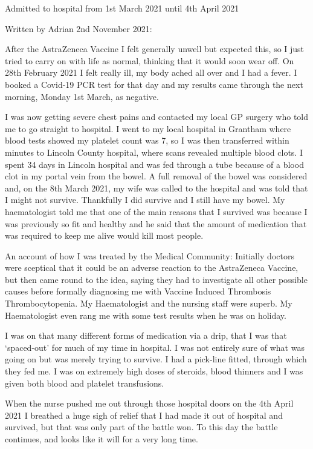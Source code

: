 Admitted to hospital from 1st March 2021 until 4th April 2021

Written by Adrian 2nd November 2021:

After the AstraZeneca Vaccine I felt generally unwell but expected this, so I
just tried to carry on with life as normal, thinking that it would soon wear
off. On 28th February 2021 I felt really ill, my body ached all over and I had a
fever. I booked a Covid-19 PCR test for that day and my results came through the
next morning, Monday 1st March, as negative.

I was now getting severe chest pains and contacted my local GP surgery who told
me to go straight to hospital. I went to my local hospital in Grantham where
blood tests showed my platelet count was 7, so I was then transferred within
minutes to Lincoln County hospital, where scans revealed multiple blood clots. I
spent 34 days in Lincoln hospital and was fed through a tube because of a blood
clot in my portal vein from the bowel. A full removal of the bowel was
considered and, on the 8th March 2021, my wife was called to the hospital and
was told that I might not survive. Thankfully I did survive and I still have my
bowel. My haematologist told me that one of the main reasons that I survived was
because I was previously so fit and healthy and he said that the amount of
medication that was required to keep me alive would kill most people.

An account of how I was treated by the Medical Community: Initially doctors were
sceptical that it could be an adverse reaction to the AstraZeneca Vaccine, but
then came round to the idea, saying they had to investigate all other possible
causes before formally diagnosing me with Vaccine Induced Thrombosis
Thrombocytopenia. My Haematologist and the nursing staff were superb. My
Haematologist even rang me with some test results when he was on holiday.

I was on that many different forms of medication via a drip, that I was that
‘spaced-out’ for much of my time in hospital. I was not entirely sure of what
was going on but was merely trying to survive. I had a pick-line fitted, through
which they fed me. I was on extremely high doses of steroids, blood thinners and
I was given both blood and platelet transfusions.

When the nurse pushed me out through those hospital doors on the 4th April 2021
I breathed a huge sigh of relief that I had made it out of hospital and
survived, but that was only part of the battle won. To this day the battle
continues, and looks like it will for a very long time.

